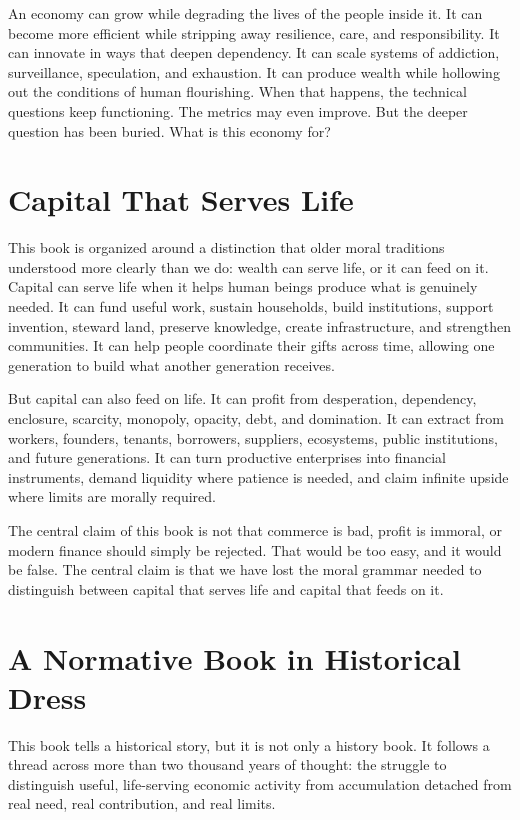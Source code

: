 \documentclass[11pt,a4paper,oneside]{book}
\begin{document}
An economy can grow while degrading the lives of the people inside it. It can become more efficient while stripping away resilience, care, and responsibility. It can innovate in ways that deepen dependency. It can scale systems of addiction, surveillance, speculation, and exhaustion. It can produce wealth while hollowing out the conditions of human flourishing. When that happens, the technical questions keep functioning. The metrics may even improve. But the deeper question has been buried. What is this economy for?

\section*{Capital That Serves Life}

This book is organized around a distinction that older moral traditions understood more clearly than we do: wealth can serve life, or it can feed on it. Capital can serve life when it helps human beings produce what is genuinely needed. It can fund useful work, sustain households, build institutions, support invention, steward land, preserve knowledge, create infrastructure, and strengthen communities. It can help people coordinate their gifts across time, allowing one generation to build what another generation receives.

But capital can also feed on life. It can profit from desperation, dependency, enclosure, scarcity, monopoly, opacity, debt, and domination. It can extract from workers, founders, tenants, borrowers, suppliers, ecosystems, public institutions, and future generations. It can turn productive enterprises into financial instruments, demand liquidity where patience is needed, and claim infinite upside where limits are morally required.

The central claim of this book is not that commerce is bad, profit is immoral, or modern finance should simply be rejected. That would be too easy, and it would be false. The central claim is that we have lost the moral grammar needed to distinguish between capital that serves life and capital that feeds on it.

\section*{A Normative Book in Historical Dress}

This book tells a historical story, but it is not only a history book. It follows a thread across more than two thousand years of thought: the struggle to distinguish useful, life-serving economic activity from accumulation detached from real need, real contribution, and real limits.
\end{document}

